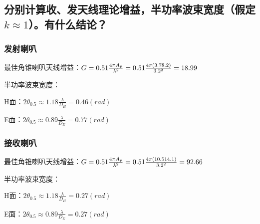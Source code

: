 \documentclass{../source/zjureport}
\begin{document}
        \subsection{分别计算收、发天线理论增益，半功率波束宽度（假定 $k\approx 1$）。有什么结论？}
            \subsubsection{发射喇叭}
            最佳角锥喇叭天线增益：$G = 0.51\frac{4\pi A_p}{\lambda^2} = 0.51\frac{4\pi\*(3.7\*8.2)}{3.2^2} = 18.99$

            半功率波束宽度：

            H面：$2\theta_{0.5} \approx 1.18\frac{\lambda}{D_H} = 0.46\left( rad \right)$

            E面：$2\theta_{0.5} \approx 0.89\frac{\lambda}{D_E} = 0.77\left( rad \right)$


            \subsubsection{接收喇叭}
            最佳角锥喇叭天线增益：$G = 0.51\frac{4\pi A_p}{\lambda^2} = 0.51\frac{4\pi\*(10.5\*14.1)}{3.2^2} = 92.66$

            半功率波束宽度：

            H面：$2\theta_{0.5} \approx 1.18\frac{\lambda}{D_H} = 0.27\left( rad \right)$

            E面：$2\theta_{0.5} \approx 0.89\frac{\lambda}{D_E} = 0.27\left( rad \right)$
\end{document}
